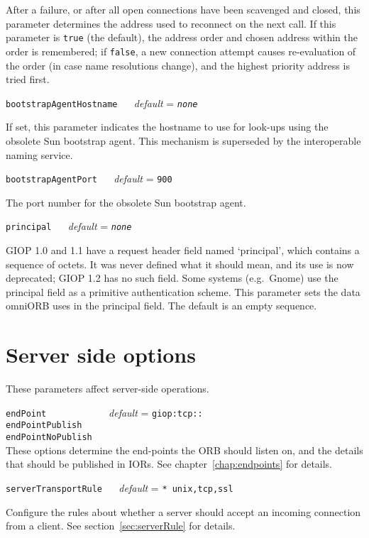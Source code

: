 \documentclass[11pt,oneside,a4paper]{book}
\makeatletter
\newcommand{\code}[1]{\texttt{#1}}
\newcommand{\confopt}[2]
  {\vspace{\baselineskip}\par\noindent\code{#1} ~~ \textit{default} =
   \code{#2}}
\renewcommand{\confopt}[2]
  {\vspace{\baselineskip}\par\noindent\code{#1} ~~ \textit{default} =
   \code{#2}\\[-1ex]\@afterheading}
\makeatother
\begin{document}
After a failure, or after all open connections have been scavenged and
closed, this parameter determines the address used to reconnect on the
next call. If this parameter is \code{true} (the default), the address
order and chosen address within the order is remembered; if
\code{false}, a new connection attempt causes re-evaluation of the
order (in case name resolutions change), and the highest priority
address is tried first.

\confopt{bootstrapAgentHostname}{\textit{none}}

If set, this parameter indicates the hostname to use for look-ups
using the obsolete Sun bootstrap agent. This mechanism is superseded
by the interoperable naming service.


\confopt{bootstrapAgentPort}{900}

The port number for the obsolete Sun bootstrap agent.


\confopt{principal}{\textit{none}}

GIOP 1.0 and 1.1 have a request header field named `principal', which
contains a sequence of octets. It was never defined what it should
mean, and its use is now deprecated; GIOP 1.2 has no such field. Some
systems (e.g.\ Gnome) use the principal field as a primitive
authentication scheme. This parameter sets the data omniORB uses in
the principal field. The default is an empty sequence.



\section{Server side options}

These parameters affect server-side operations.


\vspace{\baselineskip}

\noindent
\code{endPoint~~~~~~~~~} ~~ \textit{default} = \code{giop:tcp::}\\
\code{endPointPublish}\\
\code{endPointNoPublish}\\

\noindent
These options determine the end-points the ORB should listen on, and
the details that should be published in IORs. See
chapter~\ref{chap:endpoints} for details.



\confopt{serverTransportRule}{* unix,tcp,ssl}

Configure the rules about whether a server should accept an incoming
connection from a client. See section~\ref{sec:serverRule} for
details.
\end{document}
